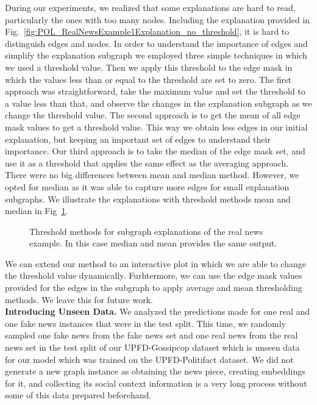 During our experiments, we realized that some explanations are hard to read, particularly the ones with too many nodes. Including the explanation provided in Fig.~\ref{fig:POL_RealNewsExample1Explanation_no_threshold}, it is hard to distinguish edges and nodes. In order to understand the importance of edges and simplify the explanation subgraph we employed three simple techniques in which we used a threshold value. Then we apply this threshold to the edge mask in which the values less than or equal to the threshold are set to zero. The first approach was straightforward, take the maximum value and set the threshold to a value less than that, and observe the changes in the explanation subgraph as we change the threshold value. The second approach is to get the mean of all edge mask values to get a threshold value. This way we obtain less edges in our initial explanation, but keeping an important set of edges to understand their importance. Our third approach is to take the median of the edge mask set, and use it as a threshold that applies the same effect as the averaging approach. There were no big differences between mean and median method. However, we opted for median as it was able to capture more edges for small explanation subgraphs. We illustrate the explanations with threshold methods mean and median in Fig~\ref{fig:POL_RealNewsExample1Explanation_with_threshold}.\\
\begin{figure}
    \centering
    \hfill
    \caption[Threshold methods for subgraph explanations of the real news example.]{Threshold methods for subgraph explanations of the real news example. In this case median and mean provides the same output.}
    \label{fig:POL_RealNewsExample1Explanation_with_threshold}
\end{figure}
We can extend our method to an interactive plot in which we are able to change the threshold value dynamically. Furhtermore, we can use the edge mask values provided for the edges in the subgraph to apply average and mean thresholding methods. We leave this for future work. \\
\textbf{Introducing Unseen Data.} We analyzed the predictions made for one real and one fake news instances that were in the test split. This time, we randomly sampled one fake news from the fake news set and one real news from the real news set in the test split of our UPFD-Gossipcop dataset which is unseen data for our model which was trained on the UPFD-Politifact dataset. We did not generate a new graph instance as obtaining the news piece, creating embeddings for it, and collecting its social context information is a very long process without some of this data prepared beforehand.\\

